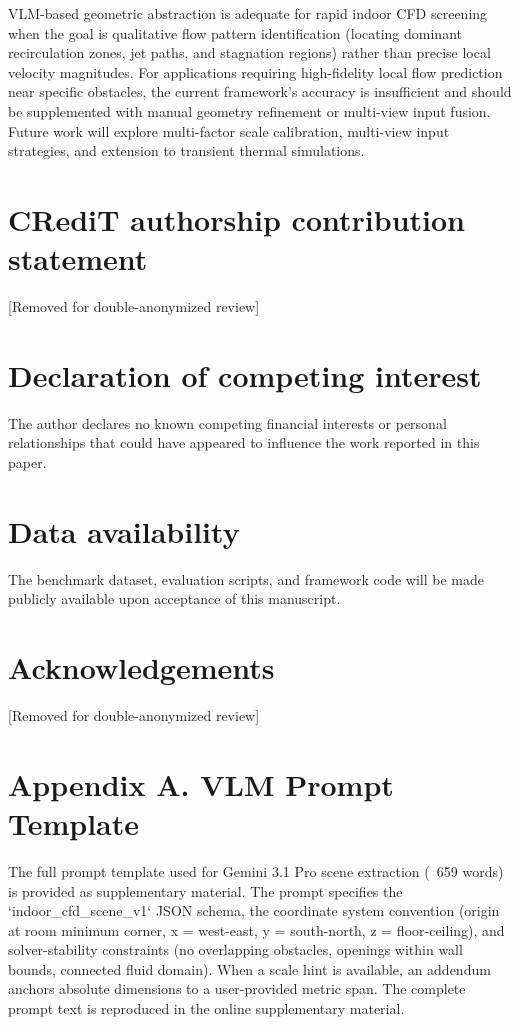 \documentclass[preprint,12pt,number]{elsarticle}
\begin{document}
VLM-based geometric abstraction is adequate for rapid indoor CFD screening when the goal is qualitative flow pattern identification (locating dominant recirculation zones, jet paths, and stagnation regions) rather than precise local velocity magnitudes. For applications requiring high-fidelity local flow prediction near specific obstacles, the current framework's accuracy is insufficient and should be supplemented with manual geometry refinement or multi-view input fusion. Future work will explore multi-factor scale calibration, multi-view input strategies, and extension to transient thermal simulations.


\section*{CRediT authorship contribution statement}


[Removed for double-anonymized review]


\section*{Declaration of competing interest}


The author declares no known competing financial interests or personal relationships that could have appeared to influence the work reported in this paper.


\section*{Data availability}


The benchmark dataset, evaluation scripts, and framework code will be made publicly available upon acceptance of this manuscript.


\section*{Acknowledgements}


[Removed for double-anonymized review]



\section{Appendix A. VLM Prompt Template}
\label{sec:appendix-a-vlm-prompt-template}


The full prompt template used for Gemini 3.1 Pro scene extraction (~659 words) is provided as supplementary material. The prompt specifies the `indoor\_cfd\_scene\_v1` JSON schema, the coordinate system convention (origin at room minimum corner, x = west-east, y = south-north, z = floor-ceiling), and solver-stability constraints (no overlapping obstacles, openings within wall bounds, connected fluid domain). When a scale hint is available, an addendum anchors absolute dimensions to a user-provided metric span. The complete prompt text is reproduced in the online supplementary material.
\end{document}

